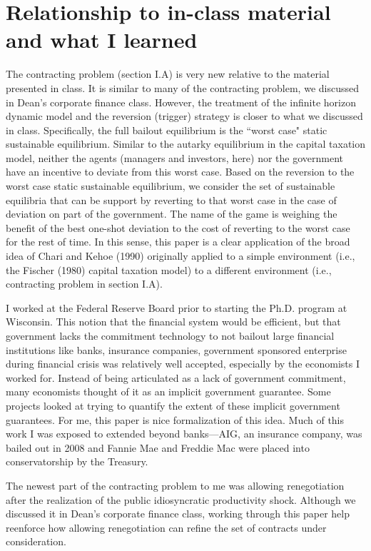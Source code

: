 \documentclass{article}
\begin{document}
\section{Relationship to in-class material and what I learned}

The contracting problem (section I.A) is very new relative to the material presented in class. It is similar to many of the contracting problem, we discussed in Dean's corporate finance class. However, the treatment of the infinite horizon dynamic model and the reversion (trigger) strategy is closer to what we discussed in class.  Specifically, the full bailout equilibrium is the ``worst case" static sustainable equilibrium.  Similar to the autarky equilibrium in the capital taxation model, neither the agents (managers and investors, here) nor the government have an incentive to deviate from this worst case.  Based on the reversion to the worst case static sustainable equilibrium, we consider the set of sustainable equilibria that can be support by reverting to that worst case in the case of deviation on part of the government.  The name of the game is weighing the benefit of the best one-shot deviation to the cost of reverting to the worst case for the rest of time.  In this sense, this paper is a clear application of the broad idea of Chari and Kehoe (1990) originally applied to a simple environment (i.e., the Fischer (1980) capital taxation model) to a different environment (i.e., contracting problem in section I.A).

\bigskip

I worked at the Federal Reserve Board prior to starting the Ph.D. program at Wisconsin.  This notion that the financial system would be efficient, but that government lacks the commitment technology to not bailout large financial institutions like banks, insurance companies, government sponsored enterprise during financial crisis was relatively well accepted, especially by the economists I worked for.  Instead of being articulated as a lack of government commitment, many economists thought of it as an implicit government guarantee. Some projects looked at trying to quantify the extent of these implicit government guarantees.  For me, this paper is nice formalization of this idea. Much of this work I was exposed to extended beyond banks---AIG, an insurance company, was bailed out in 2008 and Fannie Mae and Freddie Mac were placed into conservatorship by the Treasury.

\bigskip

The newest part of the contracting problem to me was allowing renegotiation after the realization of the public idiosyncratic productivity shock. Although we discussed it in Dean's corporate finance class, working through this paper help reenforce how allowing renegotiation can refine the set of contracts under consideration.
\end{document}
